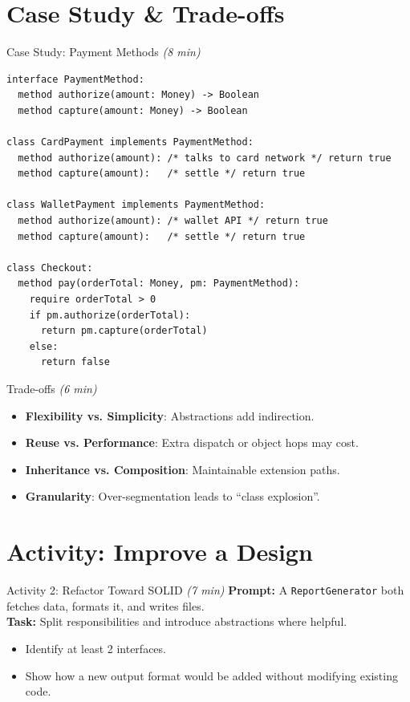 \documentclass[aspectratio=169,11pt]{beamer}
\newcommand{\mins}[1]{\textit{(#1 min)}}
\begin{document}
\section{Case Study \& Trade-offs}

\begin{frame}[fragile]{Case Study: Payment Methods \mins{8}}
\begin{lstlisting}
interface PaymentMethod:
  method authorize(amount: Money) -> Boolean
  method capture(amount: Money) -> Boolean

class CardPayment implements PaymentMethod:
  method authorize(amount): /* talks to card network */ return true
  method capture(amount):   /* settle */ return true

class WalletPayment implements PaymentMethod:
  method authorize(amount): /* wallet API */ return true
  method capture(amount):   /* settle */ return true

class Checkout:
  method pay(orderTotal: Money, pm: PaymentMethod):
    require orderTotal > 0
    if pm.authorize(orderTotal):
      return pm.capture(orderTotal)
    else:
      return false
\end{lstlisting}
\end{frame}

\begin{frame}{Trade-offs \mins{6}}
  \begin{itemize}
    \item \textbf{Flexibility vs. Simplicity}: Abstractions add indirection.
    \item \textbf{Reuse vs. Performance}: Extra dispatch or object hops may cost.
    \item \textbf{Inheritance vs. Composition}: Maintainable extension paths.
    \item \textbf{Granularity}: Over-segmentation leads to “class explosion”.
  \end{itemize}
\end{frame}

\section{Activity: Improve a Design}

\begin{frame}{Activity 2: Refactor Toward SOLID \mins{7}}
  \textbf{Prompt:} A \texttt{ReportGenerator} both fetches data, formats it, and writes files.\\
  \textbf{Task:} Split responsibilities and introduce abstractions where helpful.
  \begin{itemize}
    \item Identify at least 2 interfaces.
    \item Show how a new output format would be added without modifying existing code.
  \end{itemize}
\end{frame}
\end{document}
